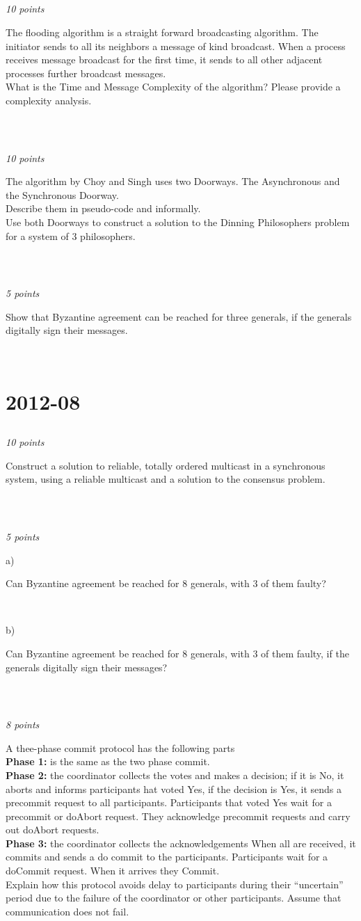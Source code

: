 \documentclass[a4paper]{article}
\newcommand{\points}[1]{\subsection{} \textit{#1 points}\\}
\newcommand{\question}[2][]{
  \noindent
  \parbox[t]{\textwidth}{#1 \parbox[t]{0.95\textwidth}{#2}}\\
}
\begin{document}
\points{10}
\question{The flooding algorithm is a straight forward broadcasting
  algorithm. The initiator sends to all its neighbors a message of
  kind broadcast. When a process receives message broadcast for the
  first time, it sends to all other adjacent processes further
  broadcast messages. \\ What is the Time and Message Complexity of
  the algorithm? Please provide a complexity analysis.}

\points{10}
\question{The algorithm by Choy and Singh uses two Doorways. The
  Asynchronous and the Synchronous Doorway. \\ Describe them in
  pseudo-code and informally. \\ Use both Doorways to construct a
  solution to the Dinning Philosophers problem for a system of 3
  philosophers.}

\points{5}
\question{Show that Byzantine agreement can be reached for three
  generals, if the generals digitally sign their messages.}

\section{2012-08}
\points{10}
\question{Construct a solution to reliable, totally ordered multicast
  in a synchronous system, using a reliable multicast and a solution
  to the consensus problem.}

\points{5}
\question[a)]{Can Byzantine agreement be reached for 8 generals, with 3 of
  them faulty?}
\question[b)]{Can Byzantine agreement be reached for 8 generals, with 3 of
  them faulty, if the generals digitally sign their messages?}

\points{8}
\question{A thee-phase commit protocol has the following parts \\
  \textbf{Phase 1:} is the same as the two phase commit.\\
  \textbf{Phase 2:} the coordinator collects the votes and makes a
  decision; if it is No, it aborts and informs participants hat voted
  Yes, if the decision is Yes, it sends a precommit request to all
  participants. Participants that voted Yes wait for a precommit or
  doAbort request. They acknowledge precommit requests and carry out
  doAbort requests. \\
  \textbf{Phase 3:} the coordinator collects the acknowledgements When
  all are received, it commits and sends a do commit to the
  participants. Participants wait for a doCommit request. When it
  arrives they Commit. \\
  Explain how this protocol avoids delay to participants during their
  ``uncertain'' period due to the failure of the coordinator or other
  participants. Assume that communication does not fail.}
\end{document}
